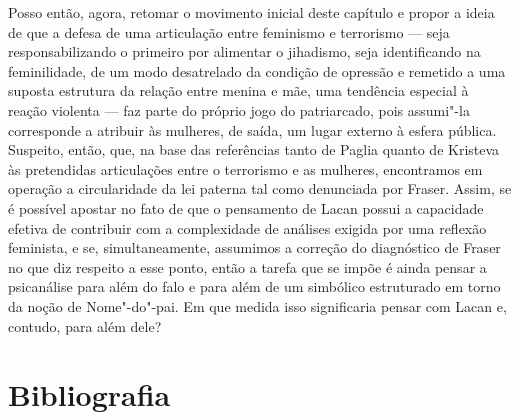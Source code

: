 Posso então, agora, retomar o movimento inicial deste capítulo e propor
a ideia de que a defesa de uma articulação entre feminismo e terrorismo
--- seja responsabilizando o primeiro por alimentar o jihadismo, seja
identificando na feminilidade, de um modo desatrelado da condição de
opressão e remetido a uma suposta estrutura da relação entre menina e
mãe, uma tendência especial à reação violenta --- faz parte do próprio
jogo do patriarcado, pois assumi"-la corresponde a atribuir às mulheres,
de saída, um lugar externo à esfera pública. Suspeito, então, que, na
base das referências tanto de Paglia quanto de Kristeva às pretendidas
articulações entre o terrorismo e as mulheres, encontramos em operação a
circularidade da lei paterna tal como denunciada por Fraser. Assim, se é
possível apostar no fato de que o pensamento de Lacan possui a
capacidade efetiva de contribuir com a complexidade de análises exigida
por uma reflexão feminista, e se, simultaneamente, assumimos a correção
do diagnóstico de Fraser no que diz respeito a esse ponto, então a
tarefa que se impõe é ainda pensar a psicanálise para além do falo e
para além de um simbólico estruturado em torno da noção de Nome"-do"-pai.
Em que medida isso significaria pensar com Lacan e, contudo, para além
dele?

\pagebreak

\section{Bibliografia}

